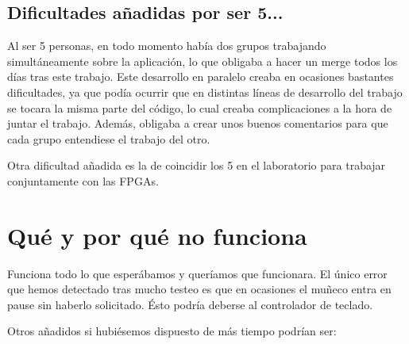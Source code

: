 \documentclass[11pt, a4paper, spanish, openright, twoside]{book}
\begin{document}
\subsection{Dificultades añadidas por ser 5...}

Al ser 5 personas, en todo momento había dos grupos trabajando simultáneamente sobre la aplicación, lo que obligaba a hacer un merge todos los días tras este trabajo. Este desarrollo en paralelo
creaba en ocasiones bastantes dificultades, ya que podía ocurrir que en distintas líneas de desarrollo del trabajo se tocara la misma parte del código,  lo cual creaba complicaciones a la hora de juntar el trabajo. Además, 
obligaba a crear unos buenos comentarios para que cada grupo entendiese el trabajo del otro. 

Otra dificultad añadida es la de coincidir los 5  en el laboratorio para trabajar conjuntamente con las FPGAs.

\section{Qué y por qué no funciona}
Funciona todo lo que esperábamos y queríamos que funcionara. El único error que hemos detectado tras mucho testeo es que en ocasiones el muñeco entra en pause sin haberlo solicitado. Ésto podría deberse al controlador de teclado.

Otros añadidos si hubiésemos dispuesto de más tiempo podrían ser:
	
\end{document}
